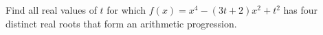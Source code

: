 Find all real values of $t$ for which $f(x)=x^4-(3t+2)x^2+t^2$ has four distinct real roots that form an arithmetic progression.
